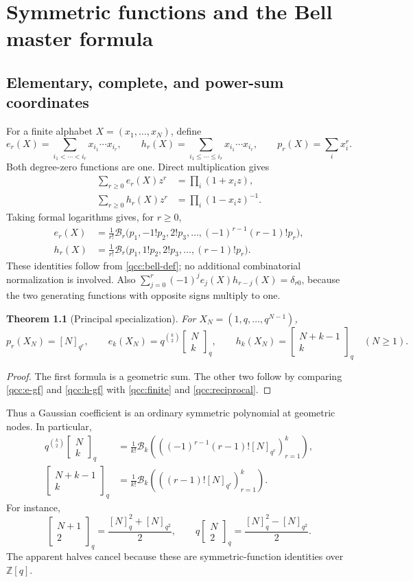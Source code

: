 \documentclass[11pt,a4paper,oneside,openany]{book}
\newtheorem{theorem}{Theorem}[chapter]
\theoremstyle{definition}
\theoremstyle{remark}
\newcommand{\Z}{\mathbb Z}
\newcommand{\GB}[3][q]{\begin{bmatrix}#2\\#3\end{bmatrix}_{#1}}
\newcommand{\qi}[2][q]{[#2]_{#1}}
\newcommand{\Y}[1]{\mathcal B_{#1}}
\begin{document}
\chapter{Symmetric functions and the Bell master formula}
\label{qcc:bell-master}
\section{Elementary, complete, and power-sum coordinates}
For a finite alphabet \(X=(x_1,\ldots,x_N)\), define
\[
 e_r(X)=\sum_{i_1<\cdots<i_r}x_{i_1}\cdots x_{i_r},\qquad
 h_r(X)=\sum_{i_1\le\cdots\le i_r}x_{i_1}\cdots x_{i_r},
 \qquad p_r(X)=\sum_i x_i^r.
\]
Both degree-zero functions are one. Direct multiplication gives
\begin{align}
 \sum_{r\ge0}e_r(X)z^r&=\prod_i(1+x_i z),\label{qcc:e-gf}\\
 \sum_{r\ge0}h_r(X)z^r&=\prod_i(1-x_i z)^{-1}.\label{qcc:h-gf}
\end{align}
Taking formal logarithms gives, for \(r\ge0\),
\begin{align}
 e_r(X)&=\frac1{r!}\Y r\bigl(p_1,-1!p_2,2!p_3,\ldots,
                         (-1)^{r-1}(r-1)!p_r\bigr),\label{qcc:e-bell}\\
 h_r(X)&=\frac1{r!}\Y r\bigl(p_1,1!p_2,2!p_3,\ldots,(r-1)!p_r\bigr).
 \label{qcc:h-bell}
\end{align}
These identities follow from \eqref{qcc:bell-def}; no additional combinatorial
normalization is involved. Also
\(\sum_{j=0}^r(-1)^j e_j(X)h_{r-j}(X)=\delta_{r0}\), because the two
generating functions with opposite signs multiply to one.

\begin{theorem}[Principal specialization]\label{qcc:principal}
For \(X_N=(1,q,\ldots,q^{N-1})\),
\begin{equation}\label{qcc:principal-formula}
 p_r(X_N)=\qi[q^r]N,\qquad
 e_k(X_N)=q^{\binom k2}\GB Nk,\qquad
 h_k(X_N)=\GB{N+k-1}k\quad(N\ge1).
\end{equation}
\end{theorem}
\begin{proof}
The first formula is a geometric sum. The other two follow by comparing
\eqref{qcc:e-gf} and \eqref{qcc:h-gf} with \eqref{qcc:finite} and
\eqref{qcc:reciprocal}.
\end{proof}
Thus a Gaussian coefficient is an ordinary symmetric polynomial at geometric
nodes. In particular,
\begin{align}
 q^{\binom k2}\GB Nk
 &=\frac1{k!}\Y k\left(\left((-1)^{r-1}(r-1)!\qi[q^r]N\right)_{r=1}^k\right),
 \label{qcc:gaussian-e-bell}\\
 \GB{N+k-1}k
 &=\frac1{k!}\Y k\left(\left((r-1)!\qi[q^r]N\right)_{r=1}^k\right).
 \label{qcc:gaussian-h-bell}
\end{align}
For instance,
\[
 \GB{N+1}2=\frac{\qi N^2+\qi[q^2]N}{2},\qquad
 q\GB N2=\frac{\qi N^2-\qi[q^2]N}{2}.
\]
The apparent halves cancel because these are symmetric-function identities over
\(\Z[q]\).
\end{document}
